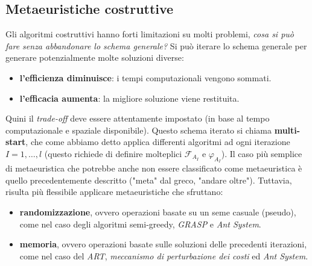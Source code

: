 \documentclass{article}
\begin{document}
\subsection{Metaeuristiche costruttive}
Gli algoritmi costruttivi hanno forti limitazioni su molti problemi, \textit{cosa si può fare senza abbandonare
    lo schema generale?} Si può iterare lo schema generale per generare potenzialmente molte soluzioni
diverse:
\begin{itemize}
    \item \textbf{l'efficienza diminuisce}: i tempi computazionali vengono sommati.
    \item \textbf{l'efficacia aumenta}: la migliore soluzione viene restituita.
\end{itemize}
Quini il \textit{trade-off} deve essere attentamente impostato (in base al tempo computazionale e spaziale
disponibile). Questo schema iterato si chiama \textbf{multi-start}, che come abbiamo detto applica
differenti algoritmi ad ogni iterazione $I=1,\dots,l$ (questo richiede di definire molteplici
$\mathcal{F}_{A_I}$ e $\varphi_{A_I}$).
Il caso più semplice di metaeuristica che potrebbe anche non essere classificato come metaeuristica
è quello precedentemente descritto ("meta" dal greco, "andare oltre").
Tuttavia, risulta più flessibile applicare metaeuristiche che sfruttano:
\begin{itemize}
    \item \textbf{randomizzazione}, ovvero operazioni basate su un seme casuale (pseudo), come nel
          caso degli algoritmi semi-greedy, \textit{GRASP} e \textit{Ant System}.
    \item \textbf{memoria}, ovvero operazioni basate sulle soluzioni delle precedenti iterazioni,
          come nel caso del \textit{ART}, \textit{meccanismo di perturbazione dei costi} ed \textit{Ant System}.
\end{itemize}
\end{document}
